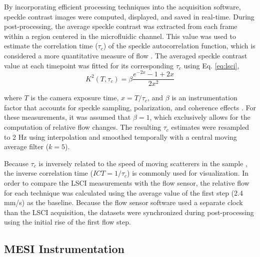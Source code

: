 \documentclass[12pt]{spieman}
\begin{document}
\begin{spacing}{2}
By incorporating efficient processing techniques\cite{Tom:2008tg} into the acquisition software, speckle contrast images were computed, displayed, and saved in real-time. During post-processing, the average speckle contrast was extracted from each frame within a region centered in the microfluidic channel. This value was used to estimate the correlation time ($\tau_{c}$) of the speckle autocorrelation function, which is considered a more quantitative measure of flow \cite{Briers:1996kfa}. The averaged speckle contrast value at each timepoint was fitted for its corresponding $\tau_{c}$ using Eq. \ref{eq:lsci},
%
\begin{equation}
    \label{eq:lsci}
    K^2(T, \tau_{c}) = \beta\frac{e^{-2x}-1+2x}{2x^2}
\end{equation}

\noindent where $T$ is the camera exposure time, $x=T/\tau_{c}$, and $\beta$ is an instrumentation factor that accounts for
speckle sampling, polarization, and coherence effects \cite{Bandyopadhyay:2005bg}. For these measurements, it was assumed that $\beta=1$, which exclusively allows for the computation of relative flow changes. The resulting $\tau_c$ estimates were resampled to 2 Hz using interpolation and smoothed temporally with a central moving average filter ($k=5$).

Because $\tau_c$ is inversely related to the speed of moving scatterers in the sample \cite{Bonner:1981hg}, the inverse correlation time ($ICT = 1/\tau_c$) is commonly used for visualization. In order to compare the LSCI measurements with the flow sensor, the relative flow for each technique was calculated using the average value of the first step (2.4 mm/s) as the baseline. Because the flow sensor software used a separate clock than the LSCI acquisition, the datasets were synchronized during post-processing using the initial rise of the first flow step.


\subsection{MESI Instrumentation}


\end{spacing}
\end{document}
